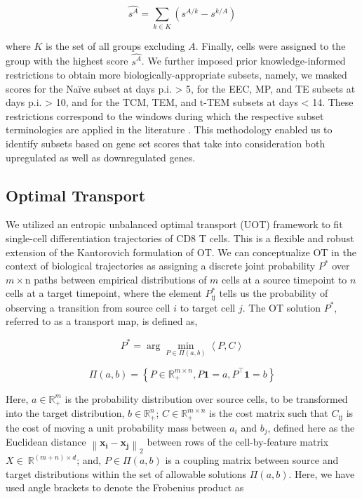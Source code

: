 \[\widehat{s^{A}} = \sum_{k \in K}^{}\left( s^{A/k} - s^{k/A} \right)\]

where \(K\) is the set of all groups excluding \(A\). Finally, cells were assigned to the group with the highest score \(\widehat{s^{A}}\). We further imposed prior knowledge-informed restrictions to obtain more biologically-appropriate subsets, namely, we masked scores for the Naïve subset at days p.i. \textgreater{} 5, for the EEC, MP, and TE subsets at days p.i. \textgreater{} 10, and for the TCM, TEM, and t-TEM subsets at days \textless{} 14. These restrictions correspond to the windows during which the respective subset terminologies are applied in the literature \citep{milnerDelineationMolecularlyDistinct2020, milnerBromodomainProteinBRD42021}. This methodology enabled us to identify subsets based on gene set scores that take into consideration both upregulated as well as downregulated genes.

\subsection{Optimal Transport}

We utilized an entropic unbalanced optimal transport (UOT) framework to fit single-cell differentiation trajectories of CD8 T cells. This is a flexible and robust extension of the Kantorovich formulation \citep{peyreComputationalOptimalTransport2020} of OT. We can conceptualize OT in the context of biological trajectories as assigning a discrete joint probability \(P^{*}\) over \(m \times \text{n\ }\)paths between empirical distributions of \(m\) cells at a source timepoint to \(n\) cells at a target timepoint, where the element \(P_{\text{ij}}^{*}\) tells us the probability of observing a transition from source cell \(i\) to target cell \(j\). The OT solution \(P^{*}\), referred to as a transport map, is defined as,

\[P^{*} = \mathrm{\arg}\underset{P \in \Pi(a,b)}{\mathrm{\min}}\left\langle P,C \right\rangle\]

\[\Pi(a,b) = \left\{ P \in \mathbb{R}_{+}^{m \times n},P\mathbf{1} = a,P^{\top}\mathbf{1} = b \right\}\]

Here, \(a \in \mathbb{R}_{+}^{m}\) is the probability distribution over source cells, to be transformed into the target distribution, \(b \in \mathbb{R}_{+}^{n}\); \(C \in \mathbb{R}_{+}^{m \times n}\) is the cost matrix such that \(C_{\text{ij}}\) is the cost of moving a unit probability mass between \(a_{i}\) and \(b_{j}\), defined here as the Euclidean distance \(\left\| \mathbf{x}_{\mathbf{i}} - \mathbf{x}_{\mathbf{j}} \right\|_{2}\) between rows of the cell-by-feature matrix \(X \in \ \mathbb{R}^{\left( m + n \right) \times d}\); and, \(P \in \Pi(a,b)\) is a coupling matrix between source and target distributions within the set of allowable solutions \(\Pi(a,b)\). Here, we have used angle brackets to denote the Frobenius product as

